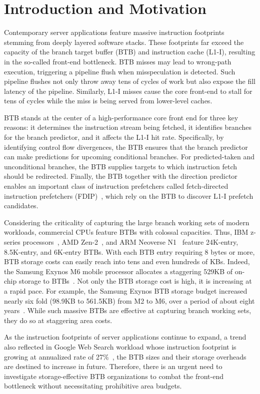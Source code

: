 \section{Introduction and Motivation}
\label{pact:sec::intro}

Contemporary server applications feature massive instruction footprints stemming from deeply layered software stacks. These footprints far exceed the capacity of the branch target buffer (BTB) and instruction cache (L1-I), resulting in the so-called front-end bottleneck. BTB misses may lead to wrong-path execution, triggering a pipeline flush when misspeculation is detected. Such pipeline flushes not only throw away tens of cycles of work but also expose the fill latency of the pipeline. Similarly, L1-I misses cause the core front-end to stall for tens of cycles while the miss is being served from lower-level caches. 

BTB stands at the center of a high-performance core front end for three key reasons: it determines the instruction stream being fetched, it identifies branches for the branch predictor, and it affects the L1-I hit rate. Specifically, by identifying control flow divergences, the BTB ensures that the branch predictor can make predictions for upcoming conditional branches. For predicted-taken and unconditional branches, the BTB supplies targets to which instruction fetch should be redirected. Finally, the BTB together with the direction predictor enables an important class of instruction prefetchers called fetch-directed instruction prefetchers (FDIP)~\cite{fdip, boomerang, shotgun}, which rely on the BTB to discover L1-I prefetch candidates. 

Considering the criticality of capturing the large branch working sets of modern workloads, commercial CPUs feature BTBs with colossal capacities. Thus, IBM z-series processors~\cite{IBMz}, AMD Zen-2~\cite{zen2}, and ARM Neoverse N1~\cite{neoverse} feature 24K-entry, 8.5K-entry, and 6K-entry BTBs. With each BTB entry requiring 8 bytes or more, BTB storage costs can easily reach into tens and even hundreds of KBs. Indeed, the Samsung Exynos M6 mobile processor allocates a staggering 529KB of on-chip storage to BTBs~\cite{exynos}. Not only the BTB storage cost is high, it is increasing at a rapid pace. For example, the Samsung Exynos BTB storage budget increased nearly six fold (98.9KB to 561.5KB) from M2 to M6, over a period of about eight years~\cite{exynos}. While such massive BTBs are effective at capturing branch working sets, they do so at staggering area costs.

As the instruction footprints of server applications continue to expand, a trend also reflected in Google Web Search workload whose instruction footprint is growing at annualized rate of 27\%~\cite{profileWarehouse}, the BTB sizes and their storage overheads are destined to increase in future. Therefore, there is an urgent need to investigate storage-effective BTB organizations to combat the front-end bottleneck without necessitating prohibitive area budgets.